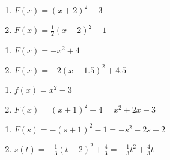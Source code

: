 \documentclass{ximera}
\begin{document}
\begin{multicols}{2}
\begin{enumerate}
\setcounter{enumi}{\value{HW}}

\item $F(x) = (x+2)^2-3$  

\item $F(x) = \frac{1}{2}(x-2)^2-1$

\setcounter{HW}{\value{enumi}}
\end{enumerate}
\end{multicols}

\begin{multicols}{2}
\begin{enumerate}
\setcounter{enumi}{\value{HW}}

\item $F(x) = -x^2+4$  

\item $F(x) =-2(x-1.5)^2+4.5$

\setcounter{HW}{\value{enumi}}
\end{enumerate}
\end{multicols}


\begin{multicols}{2}
\begin{enumerate}
\setcounter{enumi}{\value{HW}}

\item $f(x) = x^2 - 3$ 

\item $F(x) = (x+1)^2-4 = x^2+2x-3$

\setcounter{HW}{\value{enumi}}
\end{enumerate}
\end{multicols}

\begin{multicols}{2}
\begin{enumerate}
\setcounter{enumi}{\value{HW}}

\item $F(s) = -(s+1)^2-1 = -s^2-2s-2$ 

\item $s(t) = -\frac{1}{3}(t-2)^2 + \frac{4}{3}= -\frac{1}{3} t^2 + \frac{4}{3} t$

\setcounter{HW}{\value{enumi}}
\end{enumerate}
\end{multicols}
\end{document}

